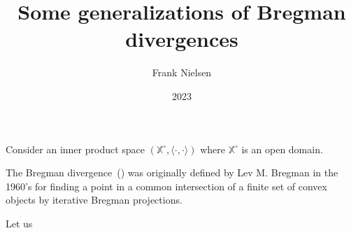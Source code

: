 \documentclass{article}
\title{Some generalizations of Bregman divergences}
\author{Frank Nielsen}
\date{2023}
\def\bbX{\mathbb{X}}
\def\inner#1#2{{\langle #1, #2\rangle}}
\begin{document}
\maketitle

Consider an inner product space $(\bbX^\circ,\inner{\cdot}{\cdot})$ where $\bbX^\circ$ is an open domain.


The Bregman divergence~(\cite{Bregman-1967}) was originally defined by Lev M. Bregman in the 1960's for finding a point in a common intersection of a finite set of convex objects by iterative Bregman projections.


Let us \cite{nielsen2009bregman}





\end{document}
